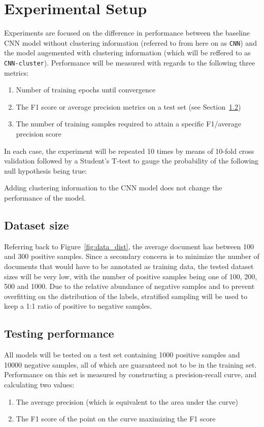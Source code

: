 \chapter{Experimental Setup}
Experiments are focused on the difference in performance between the baseline
CNN model without clustering information (referred to from here on as
\texttt{CNN}) and the model augemented with clustering information (which will
be reffered to as \texttt{CNN-cluster}). Performance will be measured with
regards to the following three metrics:
\begin{enumerate}
\item Number of training epochs until convergence
\item The F1 score or average precision metrics on a test set (see
  Section~\ref{sec:metrics})
\item The number of training samples required to attain a specific F1/average
  precision score
\end{enumerate}

In each case, the experiment will be repeated 10 times by means of 10-fold cross
validation followed by a Student's T-test to gauge the probability of the
following null hypothesis being true:
\begin{nullhypothesis}
  Adding clustering information to the CNN model does not change the
  performance of the model.
\end{nullhypothesis}

\section{Dataset size}
Referring back to Figure~\ref{fig:data_dist}, the average document has between
100 and 300 positive samples. Since a secondary concern is to minimize the
number of documents that would have to be annotated as training data, the tested
dataset sizes will be very low, with the number of positive samples being one of
100, 200, 500 and 1000. Due to the relative abundance of negative samples and to
prevent overfitting on the distribution of the labels, stratified sampling will
be used to keep a 1:1 ratio of positive to negative samples.

\section{Testing performance}
\label{sec:metrics}
All models will be tested on a test set containing 1000 positive samples and
10000 negative samples, all of which are guaranteed not to be in the training
set. Performance on this set is measured by constructing a precision-recall
curve, and calculating two values:
\begin{enumerate}
\item The average precision (which is equivalent to the area under the curve)
\item The F1 score of the point on the curve maximizing the F1 score
\end{enumerate}

